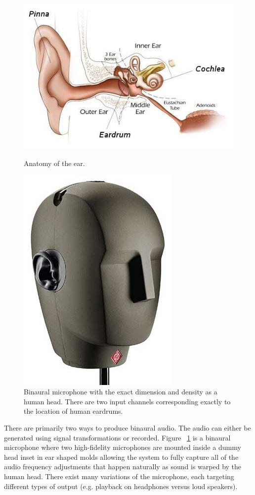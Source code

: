\begin{figure}[htbp3]
  \begin{minipage}[b]{.45\linewidth}
    \centering
    \includegraphics[width=1\textwidth]{images/ear_diagram.jpg}
    \caption{Anatomy of the ear.}
    \label{fig:ear_diagram}
  \end{minipage}
  \hspace{0.5cm}
  \begin{minipage}[b]{0.5\linewidth}
    \centering
    \includegraphics[width=.4\textwidth]{images/binaural_mic.jpg}
    \caption{Binaural microphone with the exact dimension and density as a human
     head. There are two input channels corresponding exactly to the location of
     human eardrums.}
    \label{fig:binaural_mic}
  \end{minipage}
\end{figure}

There are primarily two ways to produce binaural audio. The audio can either be
generated using signal transformations or recorded. Figure
~\ref{fig:binaural_mic} is a binaural microphone where two high-fidelity
microphones are mounted inside a dummy head inset in ear shaped molds allowing
the system to fully capture all of the audio frequency adjustments that happen
naturally as sound is warped by the human head. There exist many variations of
the microphone, each targeting different types of output (e.g. playback on
headphones versus loud speakers).


